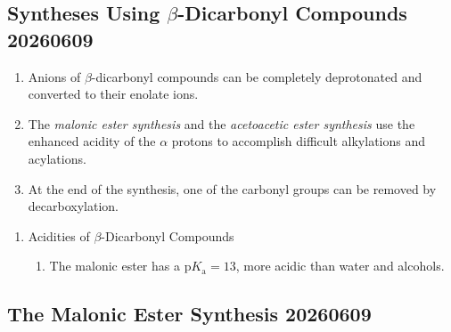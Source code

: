 \subsection[Syntheses Using beta-Dicarbonyl Compounds 20260609]{Syntheses Using $\beta$-Dicarbonyl Compounds 20260609}

\begin{enumerate}
    \item Anions of $\beta$-dicarbonyl compounds can be completely deprotonated and converted to their enolate ions.
    \item The \textit{malonic ester synthesis} and the \textit{acetoacetic ester synthesis} use the enhanced acidity of the $\alpha$ protons to accomplish difficult alkylations and acylations.
    \item At the end of the synthesis, one of the carbonyl groups can be removed by decarboxylation.
\end{enumerate}
\chemnameinit{}
\begin{center} %
     \quad
\end{center}
\begin{enumerate}[resume]
    \item Acidities of $\beta$-Dicarbonyl Compounds
    \begin{enumerate}
        \item The malonic ester has a $\mathrm{p}K_\mathrm{a} = 13$, more acidic than water and alcohols.
    \end{enumerate}
\end{enumerate}

\subsection{The Malonic Ester Synthesis 20260609}

